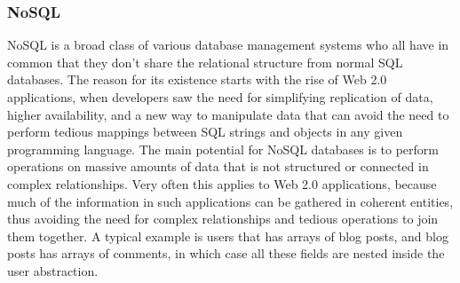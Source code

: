 \subsubsection{NoSQL}
NoSQL is a broad class of various database management systems who all have in common that they don't share the relational structure from normal SQL databases. The reason for its existence starts with the rise of Web 2.0 applications, when developers saw the need for simplifying replication of data, higher availability, and a new way to manipulate data that can avoid the need to perform tedious mappings between SQL strings and objects in any given programming language\cite{tedorm}. The main potential for NoSQL databases is to perform operations on massive amounts of data that is not structured or connected in complex relationships. Very often this applies to Web 2.0 applications, because much of the information in such applications can be gathered in coherent entities, thus avoiding the need for complex relationships and tedious operations to join them together. A typical example is users that has arrays of blog posts, and blog posts has arrays of comments, in which case all these fields are nested inside the user abstraction.

